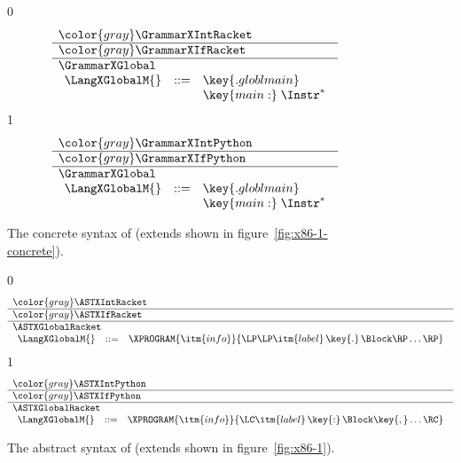 \documentclass[7x10]{TimesAPriori_MIT}%
\newcommand{\gray}[1]{{\color{gray} #1}}
\def\racketEd{0}
\def\pythonEd{1}
\providecommand{\BookEdition}{1}
\let\edition\BookEdition
\newcommand{\pythonColor}[0]{}
\numberwithin{theorem}{chapter}
\numberwithin{definition}{chapter}
\numberwithin{equation}{chapter}
\begin{document}
\begin{figure}[tp]
  \begin{tcolorbox}[colback=white]
{\if\edition\racketEd
\[
\begin{array}{l}
  \gray{\GrammarXIntRacket} \\ \hline
  \gray{\GrammarXIfRacket} \\ \hline
  \GrammarXGlobal \\
\begin{array}{lcl}
\LangXGlobalM{} &::= &  \key{.globl main} \\
      &    &  \key{main:} \; \Instr^{*} 
\end{array}
\end{array}
\]
\fi}
{\if\edition\pythonEd\pythonColor    
\[
\begin{array}{l}
  \gray{\GrammarXIntPython} \\ \hline
  \gray{\GrammarXIfPython} \\ \hline
  \GrammarXGlobal \\
\begin{array}{lcl}
\LangXGlobalM{} &::= &  \key{.globl main} \\
      &    &  \key{main:} \; \Instr^{*} 
\end{array}
\end{array}
\]
\fi}
  \end{tcolorbox}
\caption{The concrete syntax of \LangXGlobal{}  (extends \LangXIf{} shown in figure~\ref{fig:x86-1-concrete}).}
\label{fig:x86-2-concrete}
\end{figure}

\begin{figure}[tp]
\begin{tcolorbox}[colback=white]
    \small
{\if\edition\racketEd    
\[
\begin{array}{l}
  \gray{\ASTXIntRacket} \\ \hline
  \gray{\ASTXIfRacket} \\ \hline
  \ASTXGlobalRacket \\
\begin{array}{lcl}
\LangXGlobalM{} &::= & \XPROGRAM{\itm{info}}{\LP\LP\itm{label} \,\key{.}\, \Block \RP\ldots\RP}
\end{array}
\end{array}
\]
\fi}
{\if\edition\pythonEd\pythonColor
\[
\begin{array}{l}
  \gray{\ASTXIntPython} \\ \hline
  \gray{\ASTXIfPython} \\ \hline
  \ASTXGlobalRacket \\
\begin{array}{lcl}
\LangXGlobalM{} &::= & \XPROGRAM{\itm{info}}{\LC\itm{label} \,\key{:}\, \Block \key{,} \ldots \RC }
\end{array}
\end{array}
\]
\fi}
\end{tcolorbox}

\caption{The abstract syntax of \LangXGlobal{} (extends \LangXIf{} shown in figure~\ref{fig:x86-1}).}
\label{fig:x86-2}
\end{figure}
\end{document}
